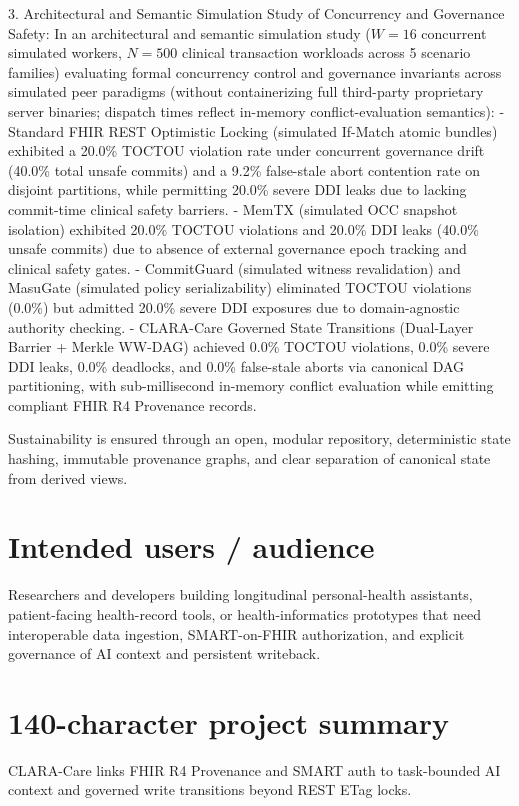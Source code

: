 \documentclass[10pt,letterpaper]{article}
\begin{document}
3. Architectural and Semantic Simulation Study of Concurrency and Governance Safety:
In an architectural and semantic simulation study ($W=16$ concurrent simulated workers, $N=500$ clinical transaction workloads across 5 scenario families) evaluating formal concurrency control and governance invariants across simulated peer paradigms (without containerizing full third-party proprietary server binaries; dispatch times reflect in-memory conflict-evaluation semantics):
- Standard FHIR REST Optimistic Locking (simulated If-Match atomic bundles) exhibited a 20.0\% TOCTOU violation rate under concurrent governance drift (40.0\% total unsafe commits) and a 9.2\% false-stale abort contention rate on disjoint partitions, while permitting 20.0\% severe DDI leaks due to lacking commit-time clinical safety barriers.
- MemTX (simulated OCC snapshot isolation) exhibited 20.0\% TOCTOU violations and 20.0\% DDI leaks (40.0\% unsafe commits) due to absence of external governance epoch tracking and clinical safety gates.
- CommitGuard (simulated witness revalidation) and MasuGate (simulated policy serializability) eliminated TOCTOU violations (0.0\%) but admitted 20.0\% severe DDI exposures due to domain-agnostic authority checking.
- CLARA-Care Governed State Transitions (Dual-Layer Barrier + Merkle WW-DAG) achieved 0.0\% TOCTOU violations, 0.0\% severe DDI leaks, 0.0\% deadlocks, and 0.0\% false-stale aborts via canonical DAG partitioning, with sub-millisecond in-memory conflict evaluation while emitting compliant FHIR R4 Provenance records.

Sustainability is ensured through an open, modular repository, deterministic state hashing, immutable provenance graphs, and clear separation of canonical state from derived views.

\section{Intended users / audience}
Researchers and developers building longitudinal personal-health assistants, patient-facing health-record tools, or health-informatics prototypes that need interoperable data ingestion, SMART-on-FHIR authorization, and explicit governance of AI context and persistent writeback.

\section{140-character project summary}
CLARA-Care links FHIR R4 Provenance and SMART auth to task-bounded AI context and governed write transitions beyond REST ETag locks.
\end{document}
